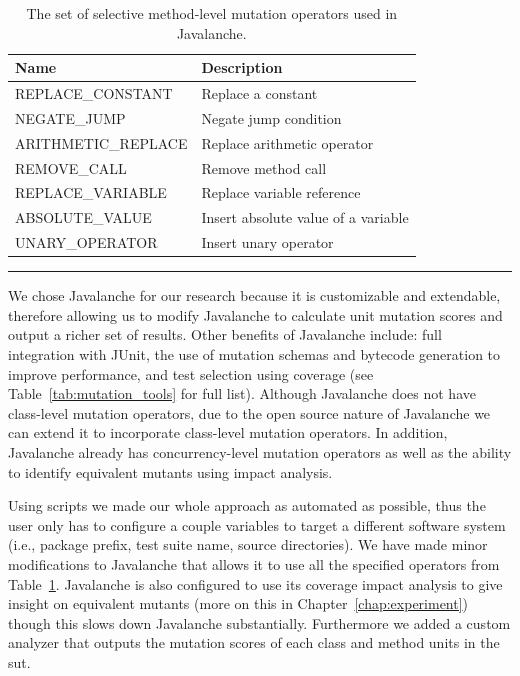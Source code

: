 \begin{table}[!tb]
  \centering
  \begin{tabular}{|l|l|}
    \hline
    \rowcolor[RGB]{169,196,223}
    \textbf{Name} & \textbf{Description} \\
    \hline REPLACE\_CONSTANT & Replace a constant \\
    \hline NEGATE\_JUMP & Negate jump condition \\
    \hline ARITHMETIC\_REPLACE & Replace arithmetic operator \\
    \hline REMOVE\_CALL & Remove method call \\
    \hline REPLACE\_VARIABLE & Replace variable reference\\
    \hline ABSOLUTE\_VALUE & Insert absolute value of a variable \\
    \hline UNARY\_OPERATOR & Insert unary operator \\
    \hline
  \end{tabular}
  \caption{The set of selective method-level mutation operators used in Javalanche.}
  \label{tab:javalanche_operators}
  \vspace{2mm}
  \hrule
\end{table}

We chose Javalanche for our research because it is customizable and extendable, therefore allowing us to modify Javalanche to calculate unit mutation scores and output a richer set of results. Other benefits of Javalanche include: full integration with JUnit, the use of mutation schemas and bytecode generation to improve performance, and test selection using coverage (see Table~\ref{tab:mutation_tools} for full list). Although Javalanche does not have class-level mutation operators, due to the open source nature of Javalanche we can extend it to incorporate class-level mutation operators. In addition, Javalanche already has concurrency-level mutation operators as well as the ability to identify equivalent mutants using impact analysis.

Using scripts we made our whole approach as automated as possible, thus the user only has to configure a couple variables to target a different software system (i.e., package prefix, test suite name, source directories). We have made minor modifications to Javalanche that allows it to use all the specified operators from Table~\ref{tab:javalanche_operators}. Javalanche is also configured to use its coverage impact analysis to give insight on equivalent mutants (more on this in Chapter~\ref{chap:experiment}) though this slows down Javalanche substantially. Furthermore we added a custom analyzer that outputs the mutation scores of each class and method units in the \gls{sut}.

